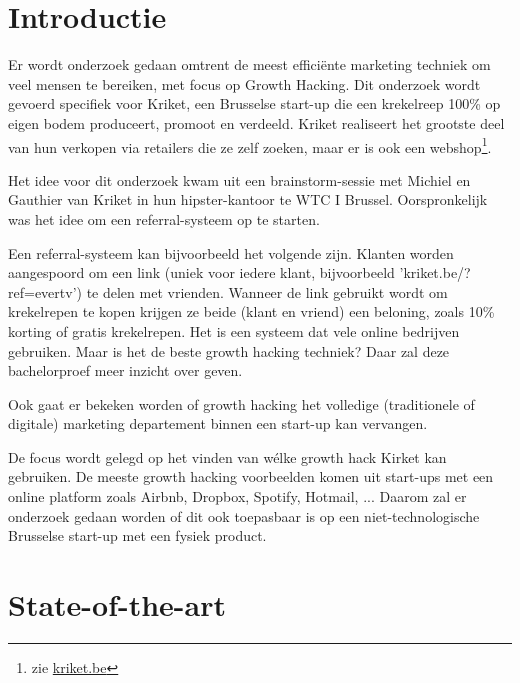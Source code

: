 
\section{Introductie} %
\label{sec:introductie}

Er wordt onderzoek gedaan omtrent de meest efficiënte marketing techniek om veel mensen te bereiken, met focus op Growth Hacking. Dit onderzoek wordt gevoerd specifiek voor Kriket, een Brusselse start-up die een krekelreep 100\% op eigen bodem produceert, promoot en verdeeld. Kriket realiseert het grootste deel van hun verkopen via retailers die ze zelf zoeken, maar er is ook een webshop\footnote{zie \href{https://kriket.be}{kriket.be}}.

Het idee voor dit onderzoek kwam uit een brainstorm-sessie met Michiel en Gauthier van Kriket in hun hipster-kantoor te WTC I Brussel. Oorspronkelijk was het idee om een referral-systeem op te starten. 

Een referral-systeem kan bijvoorbeeld het volgende zijn. Klanten worden aangespoord om een link (uniek voor iedere klant, bijvoorbeeld 'kriket.be/?ref=evertv') te delen met vrienden. Wanneer de link gebruikt wordt om krekelrepen te kopen krijgen ze beide (klant en vriend) een beloning, zoals 10\% korting of gratis krekelrepen. Het is een systeem dat vele online bedrijven gebruiken. Maar is het de beste growth hacking techniek? Daar zal deze bachelorproef meer inzicht over geven.

Ook gaat er bekeken worden of growth hacking het volledige (traditionele of digitale) marketing departement binnen een start-up kan vervangen.

De focus wordt gelegd op het vinden van wélke growth hack Kirket kan gebruiken. De meeste growth hacking voorbeelden komen uit start-ups met een online platform zoals Airbnb, Dropbox, Spotify, Hotmail, ... Daarom zal er onderzoek gedaan worden of dit ook toepasbaar is op een niet-technologische Brusselse start-up met een fysiek product.


\section{State-of-the-art}
\label{sec:state-of-the-art}

